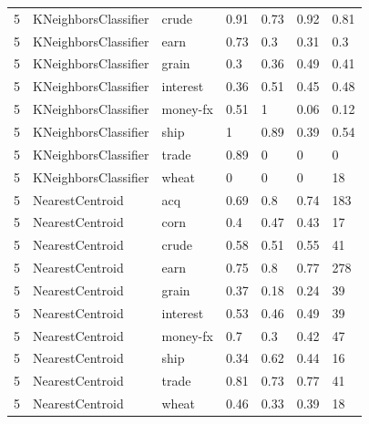 \documentclass{article}
\begin{document}
\begin{table}[h]
\begin{tabular}{lllllll}
5             & KNeighborsClassifier   & crude           & 0.91               & 0.73            & 0.92              & 0.81             \\
5             & KNeighborsClassifier   & earn            & 0.73               & 0.3             & 0.31              & 0.3              \\
5             & KNeighborsClassifier   & grain           & 0.3                & 0.36            & 0.49              & 0.41             \\
5             & KNeighborsClassifier   & interest        & 0.36               & 0.51            & 0.45              & 0.48             \\
5             & KNeighborsClassifier   & money-fx        & 0.51               & 1               & 0.06              & 0.12             \\
5             & KNeighborsClassifier   & ship            & 1                  & 0.89            & 0.39              & 0.54             \\
5             & KNeighborsClassifier   & trade           & 0.89               & 0               & 0                 & 0                \\
5             & KNeighborsClassifier   & wheat           & 0                  & 0               & 0                 & 18               \\
5             & NearestCentroid        & acq             & 0.69               & 0.8             & 0.74              & 183              \\
5             & NearestCentroid        & corn            & 0.4                & 0.47            & 0.43              & 17               \\
5             & NearestCentroid        & crude           & 0.58               & 0.51            & 0.55              & 41               \\
5             & NearestCentroid        & earn            & 0.75               & 0.8             & 0.77              & 278              \\
5             & NearestCentroid        & grain           & 0.37               & 0.18            & 0.24              & 39               \\
5             & NearestCentroid        & interest        & 0.53               & 0.46            & 0.49              & 39               \\
5             & NearestCentroid        & money-fx        & 0.7                & 0.3             & 0.42              & 47               \\
5             & NearestCentroid        & ship            & 0.34               & 0.62            & 0.44              & 16               \\
5             & NearestCentroid        & trade           & 0.81               & 0.73            & 0.77              & 41               \\
5             & NearestCentroid        & wheat           & 0.46               & 0.33            & 0.39              & 18               \end{tabular}
\end{table}
\end{document}
